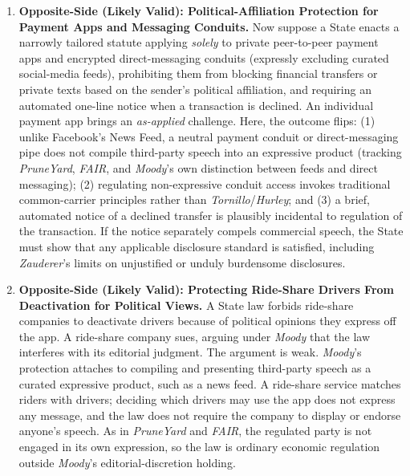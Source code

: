 \documentclass[12pt]{article}
\begin{document}
\begin{enumerate}
\item \textbf{Opposite-Side (Likely Valid): Political-Affiliation Protection for Payment Apps and Messaging Conduits.} Now suppose a State enacts a narrowly tailored statute applying \emph{solely} to private peer-to-peer payment apps and encrypted direct-messaging conduits (expressly excluding curated social-media feeds), prohibiting them from blocking financial transfers or private texts based on the sender's political affiliation, and requiring an automated one-line notice when a transaction is declined. An individual payment app brings an \emph{as-applied} challenge. Here, the outcome flips: (1) unlike Facebook's News Feed, a neutral payment conduit or direct-messaging pipe does not compile third-party speech into an expressive product (tracking \textit{PruneYard}, \textit{FAIR}, and \textit{Moody}'s own distinction between feeds and direct messaging); (2) regulating non-expressive conduit access invokes traditional common-carrier principles rather than \textit{Tornillo}/\textit{Hurley}; and (3) a brief, automated notice of a declined transfer is plausibly incidental to regulation of the transaction. If the notice separately compels commercial speech, the State must show that any applicable disclosure standard is satisfied, including \textit{Zauderer}'s limits on unjustified or unduly burdensome disclosures.

\item \textbf{Opposite-Side (Likely Valid): Protecting Ride-Share Drivers From Deactivation for Political Views.} A State law forbids ride-share companies to deactivate drivers because of political opinions they express off the app. A ride-share company sues, arguing under \textit{Moody} that the law interferes with its editorial judgment. The argument is weak. \textit{Moody}'s protection attaches to compiling and presenting third-party speech as a curated expressive product, such as a news feed. A ride-share service matches riders with drivers; deciding which drivers may use the app does not express any message, and the law does not require the company to display or endorse anyone's speech. As in \textit{PruneYard} and \textit{FAIR}, the regulated party is not engaged in its own expression, so the law is ordinary economic regulation outside \textit{Moody}'s editorial-discretion holding.


\end{enumerate}
\end{document}
